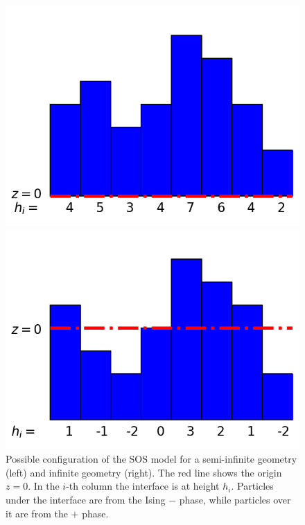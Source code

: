 \begin{figure}
    \begin{minipage}[t]{0.5\linewidth}
        \includegraphics[width=0.9\linewidth]{int-dyn/sos-indiscernable.png}
    \end{minipage}
    \begin{minipage}[t]{0.5\linewidth}
        \includegraphics[width=0.9\linewidth]{int-dyn/sos-indiscernable-inf.png}        
    \end{minipage}    
    \caption{Possible configuration of the SOS model for a semi-infinite geometry (left) and infinite geometry (right). The red line shows the origin $z=0$. In the $i$-th column the interface is at height $h_i$. Particles under the interface are from the Ising $-$ phase, while particles over it are from the $+$ phase.}
    \label{figure-sos}
\end{figure}

